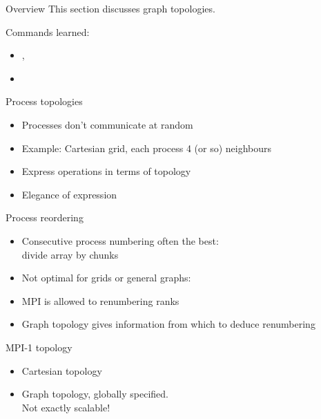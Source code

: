 
\begin{frame}[containsverbatim]{Overview}
  This section discusses graph topologies.

  Commands learned:
  \begin{itemize}
  \item {}, 
  \item {}
  \end{itemize}
\end{frame}

\begin{frame}[containsverbatim]{Process topologies}
  \begin{itemize}
  \item Processes don't communicate at random
  \item Example: Cartesian grid, each process 4 (or so) neighbours
  \item Express operations in terms of topology
  \item Elegance of expression
  \end{itemize}
\end{frame}

\begin{frame}[containsverbatim]{Process reordering}
  \begin{itemize}
  \item Consecutive process numbering often the best:\\
    divide array by chunks
  \item Not optimal for grids or general graphs:
  \item MPI is allowed to renumbering ranks
  \item Graph topology gives information from which to deduce
    renumbering
  \end{itemize}
\end{frame}

\begin{frame}[containsverbatim]{MPI-1 topology}
  \begin{itemize}
  \item Cartesian topology
  \item Graph topology, globally specified.\\
    Not exactly scalable!
  \end{itemize}
\end{frame}

